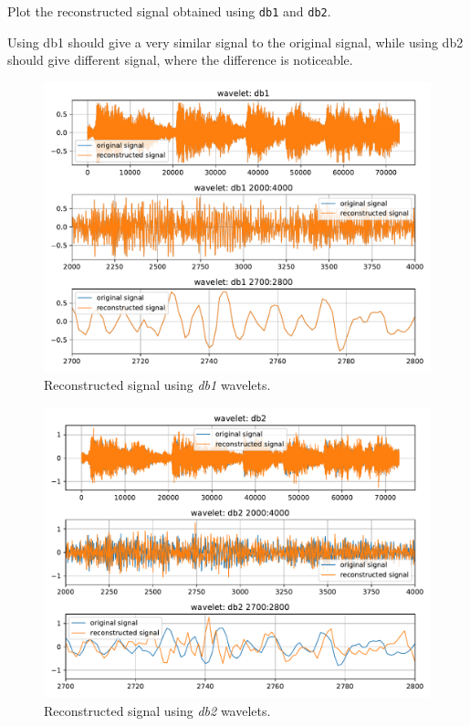 
\begin{tcolorbox}[colback=red!5!white,colframe=red!75!black,title=Problem 1.b]
    Plot the reconstructed signal obtained using \verb|db1| and \verb|db2|.
\end{tcolorbox}

Using db1 should give a very similar signal to the original signal, while using db2 should give different signal, where the difference is noticeable.


\begin{figure}[H]
    \centering
    \includegraphics[width=\textwidth]{./img/problem1-2-reconstructed-signal-db1.pdf}
    \caption{Reconstructed signal using \textit{db1} wavelets.}
    \label{fig:y_reconstructed_with_db1}
\end{figure}

\begin{figure}[H]
    \centering
    \includegraphics[width=\textwidth]{./img/problem1-2-reconstructed-signal-db2.pdf}
    \caption{Reconstructed signal using \textit{db2} wavelets.}
    \label{fig:y_reconstructed_with_db2}
\end{figure}



